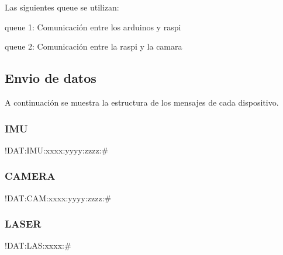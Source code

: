 Las siguientes queue se utilizan\+:
\begin{DoxyItemize}
\item queue 1\+: Comunicación entre los arduinos y raspi
\item queue 2\+: Comunicación entre la raspi y la camara
\end{DoxyItemize}\hypertarget{index_autotoc_md8}{}\subsection{Envio de datos}\label{index_autotoc_md8}
A continuación se muestra la estructura de los mensajes de cada dispositivo. \subsubsection*{I\+MU}

!\+D\+AT\+:I\+M\+U\+:xxxx\+:yyyy\+:zzzz\+:\#

\subsubsection*{C\+A\+M\+E\+RA}

!\+D\+AT\+:C\+A\+M\+:xxxx\+:yyyy\+:zzzz\+:\#

\subsubsection*{L\+A\+S\+ER}

!\+D\+AT\+:L\+A\+S\+:xxxx\+:\# 
